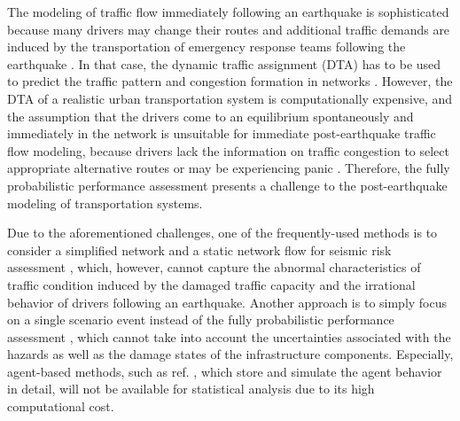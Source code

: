 \documentclass[review,11pt,nonatbib]{elsarticle}
\begin{document}
The modeling of traffic flow immediately following an earthquake is sophisticated because many drivers may change their routes and additional traffic demands are induced by the transportation of emergency response teams following the earthquake \citep{ahn2014study}. In that case, the dynamic traffic assignment (DTA) has to be used to predict the traffic pattern and congestion formation in networks \citep{Szeto2011A,Tanimoto2015}. However, the DTA of a realistic urban transportation system is computationally expensive, and the assumption that the drivers come to an equilibrium spontaneously and immediately in the network is unsuitable for immediate post-earthquake traffic flow modeling, because drivers lack the information on traffic congestion to select appropriate alternative routes or may be experiencing panic \citep{pel2011modelling}. Therefore, the fully probabilistic performance assessment presents a challenge to the post-earthquake modeling of transportation systems.
\par Due to the aforementioned challenges, one of the frequently-used methods is to consider a simplified network and a static network flow for seismic risk assessment \citep{Duenas2007Seismic,Miller2015Estimating}, which, however, cannot capture the abnormal characteristics of traffic condition induced by the damaged traffic capacity and the irrational behavior of drivers following an earthquake. Another approach is to simply focus on a single scenario event instead of the fully probabilistic performance assessment  \citep{freckleton2012evaluation,chang2012post,feng2017post}, which cannot take into account the uncertainties associated with the hazards as well as the damage states of the infrastructure components. Especially, agent-based methods, such as ref. \citet{feng2017post}, which store and simulate the agent behavior in detail, will not be available for statistical analysis due to its high computational cost. 
\end{document}

